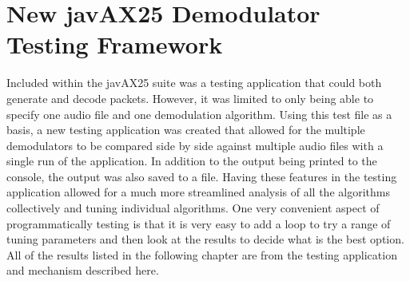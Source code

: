 \section{New javAX25 Demodulator Testing Framework}
Included within the javAX25 suite was a testing application that could both generate and decode packets. However, it was limited to only being able to specify one audio file and one demodulation algorithm. Using this test file as a basis, a new testing application was created that allowed for the multiple demodulators to be compared side by side against multiple audio files with a single run of the application. In addition to the output being printed to the console, the output was also saved to a file. Having these features in the testing application allowed for a much more streamlined analysis of all the algorithms collectively and tuning individual algorithms. One very convenient aspect of programmatically testing is that it is very easy to add a loop to try a range of tuning parameters and then look at the results to decide what is the best option. All of the results listed in the following chapter are from the testing application and mechanism described here.
